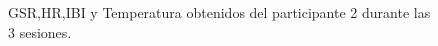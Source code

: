 \begin{figure}[h]
        \centering
        \caption{GSR,HR,IBI y Temperatura obtenidos del participante 2 durante las 3 sesiones.}\label{fig:data_p2}
\end{figure}
\pagebreak

